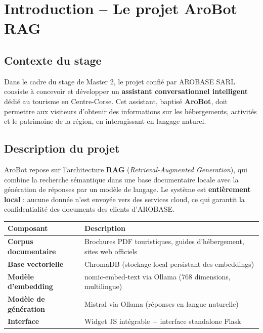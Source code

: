 \documentclass[12pt,a4paper]{report}
\begin{document}
\tableofcontents\newpage

\chapter{Introduction -- Le projet AroBot RAG}

\section{Contexte du stage}

Dans le cadre du stage de Master 2, le projet confi\'{e} par AROBASE SARL consiste \`{a}
concevoir et d\'{e}velopper un \textbf{assistant conversationnel intelligent} d\'{e}di\'{e} au tourisme
en Centre-Corse. Cet assistant, baptis\'{e} \textbf{AroBot}, doit permettre aux visiteurs
d'obtenir des informations sur les h\'{e}bergements, activit\'{e}s et le patrimoine de la r\'{e}gion,
en interagissant en langage naturel.

\section{Description du projet}

AroBot repose sur l'architecture \textbf{RAG} (\textit{Retrieval-Augmented Generation}),
qui combine la recherche s\'{e}mantique dans une base documentaire locale avec la g\'{e}n\'{e}ration
de r\'{e}ponses par un mod\`{e}le de langage. Le syst\`{e}me est \textbf{enti\`{e}rement local} :
aucune donn\'{e}e n'est envoy\'{e}e vers des services cloud, ce qui garantit la confidentialit\'{e}
des documents des clients d'AROBASE.

\begin{center}
\renewcommand{\arraystretch}{1.3}
\begin{tabular}{>{\bfseries}p{4cm} p{9cm}}
  \toprule
  \rowcolor{rowblue}
  \textbf{Composant} & \textbf{Description} \\
  \midrule
  Corpus documentaire & Brochures PDF touristiques, guides d'h\'{e}bergement, sites web officiels \\
  Base vectorielle & ChromaDB (stockage local persistant des embeddings) \\
  Mod\`{e}le d'embedding & nomic-embed-text via Ollama (768 dimensions, multilingue) \\
  Mod\`{e}le de g\'{e}n\'{e}ration & Mistral via Ollama (r\'{e}ponses en langue naturelle) \\
  Interface & Widget JS int\'{e}grable + interface standalone Flask \\
  \bottomrule
\end{tabular}
\end{center}
\end{document}
